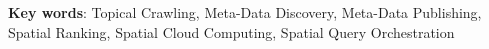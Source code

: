 \begin{flushleft}
{\textbf{Key words}: Topical Crawling, Meta-Data Discovery, Meta-Data Publishing, Spatial Ranking, Spatial Cloud Computing, Spatial Query Orchestration}\\

\end{flushleft}







